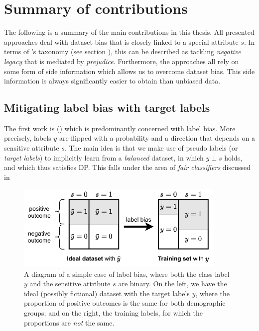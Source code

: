 \chapter{Summary of contributions}\label{ch:content}
The following is a summary of the main contributions in this thesis.
All presented approaches deal with dataset bias that is closely linked to a special attribute $s$.
In terms of \citet{kamishima2012fairness}'s taxonomy (see section ),
this can be described as tackling \emph{negative legacy} that is mediated by \emph{prejudice}.
Furthermore, the approaches all rely on some form of side information which allows us to overcome dataset bias.
This side information is always significantly easier to obtain than unbiased data.


\section{Mitigating label bias with target labels}\label{sec:target-labels}
The first work is \citet{kehrenberg2020tuning} ()
which is predominantly concerned with label bias.
More precisely, labels \(y\) are flipped with a probability and a direction that depends on a sensitive attribute \(s\).
The main idea is that we make use of pseudo labels (or \emph{target labels})
to implicitly learn from a \emph{balanced} dataset,
in which \(y\perp s\) holds, and which thus satisfies \acf{DP}.
This falls under the area of \emph{fair classifiers} discussed in 

\begin{figure}[tp]
  \centering
  \includegraphics[width=0.9\textwidth]{figures/label_bias.pdf}
  \caption{%
    A diagram of a simple case of label bias, where both the class label \(y\) and the sensitive attribute \(s\) are binary.
    On the left, we have the ideal (possibly fictional) dataset with the target labels \(\bar{y}\),
    where the proportion of positive outcomes is the same for both demographic groups;
    and on the right, the training labels, for which the proportions are \emph{not} the same.
  }%
  \label{fig:label-bias-overview}
\end{figure}

